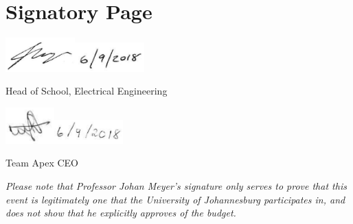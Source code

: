 \documentclass[a4paper, 12pt]{article}
\begin{document}
	\hypersetup{pageanchor=true}
	\tableofcontents
	\listoffigures
	\newpage

	\section*{Signatory Page} %
	\label{sec:signatory_page}
		\vspace*{8em}
		\hspace*{1cm}\includegraphics[width=0.2\textwidth]{img/prof_sig.png}\hspace*{\fill}\includegraphics[width=0.2\textwidth]{img/prof_date.png}\vspace*{1em}\par\noindent
		{Head of School, Electrical Engineering\par}
		\vspace*{8em}
		\hspace*{1cm}\includegraphics[width=0.14\textwidth]{img/wes_sig.png}\hspace*{\fill}\includegraphics[width=0.2\textwidth]{img/wes_date.png}\vspace*{1em}\par\noindent
		\noindent{}
		{Team Apex CEO}\par
		\vspace*{\fill}
		\noindent\textit{Please note that Professor Johan Meyer's signature only serves to prove that this event is legitimately one that the University of Johannesburg participates in, and does not show that he explicitly approves of the budget.}
	\newpage
\end{document}
